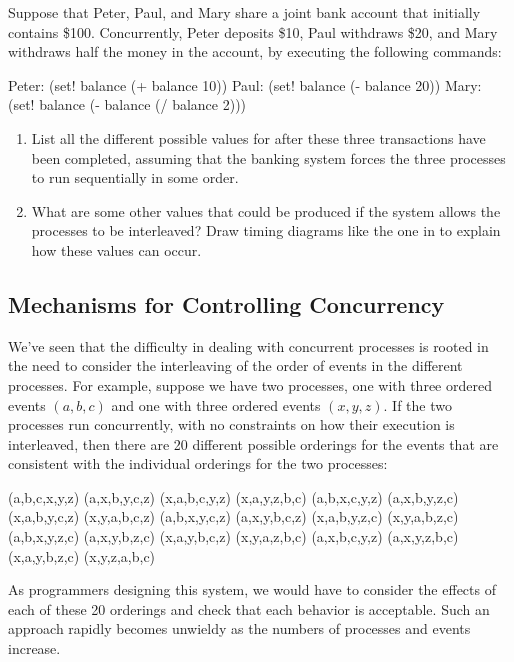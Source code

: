 \begin{exercise}
	\label{Exercise 3.38}
	Suppose that Peter, Paul, and Mary share a joint bank account that initially contains \$100.
	Concurrently, Peter deposits \$10, Paul withdraws \$20, and Mary withdraws half the money in the account, by executing the following commands:
	\begin{scheme}
	  Peter: (set! balance (+ balance 10))
	  Paul:  (set! balance (- balance 20))
	  Mary:  (set! balance (- balance (/ balance 2)))
	\end{scheme}
	\begin{enumerate}[label = \alph*., leftmargin = *]

		\item
			List all the different possible values for  after these three transactions have been completed, assuming that the banking system forces the three processes to run sequentially in some order.

		\item
			What are some other values that could be produced if the system allows the processes to be interleaved?
			Draw timing diagrams like the one in  to explain how these values can occur.

	\end{enumerate}
\end{exercise}



\subsection{Mechanisms for Controlling Concurrency}
\label{Section 3.4.2}

We’ve seen that the difficulty in dealing with concurrent processes is rooted in the need to consider the interleaving of the order of events in the different processes.
For example, suppose we have two processes, one with three ordered events \( (a, b, c) \) and one with three ordered events \( (x, y, z) \).
If the two processes run concurrently, with no constraints on how their execution is interleaved, then there are 20 different possible orderings for the events that are consistent with the individual orderings for the two processes:
\begin{example}
	(a,b,c,x,y,z)  (a,x,b,y,c,z)  (x,a,b,c,y,z)  (x,a,y,z,b,c)
	(a,b,x,c,y,z)  (a,x,b,y,z,c)  (x,a,b,y,c,z)  (x,y,a,b,c,z)
	(a,b,x,y,c,z)  (a,x,y,b,c,z)  (x,a,b,y,z,c)  (x,y,a,b,z,c)
	(a,b,x,y,z,c)  (a,x,y,b,z,c)  (x,a,y,b,c,z)  (x,y,a,z,b,c)
	(a,x,b,c,y,z)  (a,x,y,z,b,c)  (x,a,y,b,z,c)  (x,y,z,a,b,c)
\end{example}
As programmers designing this system, we would have to consider the effects of each of these 20 orderings and check that each behavior is acceptable.
Such an approach rapidly becomes unwieldy as the numbers of processes and events increase.

